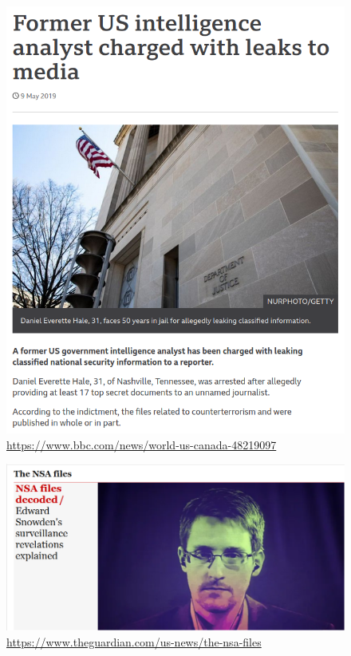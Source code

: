 \begin{frame}
  \begin{figure}
    \includegraphics[width=\columnwidth]{figs/nsa-leak.png}
    \caption{\url{https://www.bbc.com/news/world-us-canada-48219097}}
  \end{figure}
\end{frame}

\begin{frame}
  \begin{figure}
    \includegraphics[width=\columnwidth]{figs/snowden.png}
    \caption{\url{https://www.theguardian.com/us-news/the-nsa-files}}
  \end{figure}
\end{frame}

